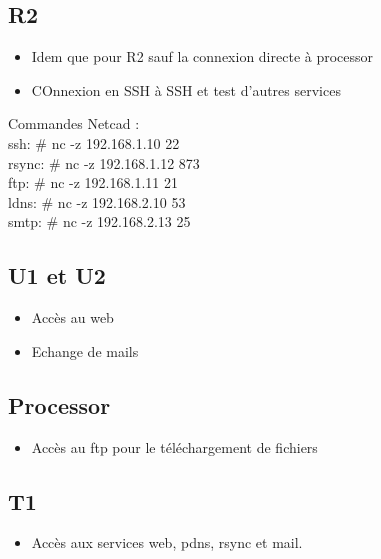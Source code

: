 \documentclass[a4paper,10pt,final,fleqn]{article}
\begin{document}
	\subsection{R2}

	\begin{itemize}
		\item Idem que pour R2 sauf la connexion directe à processor
		\item COnnexion en SSH à SSH et test d'autres services
	\end{itemize}


	Commandes Netcad : \\

	ssh:    # nc -z 192.168.1.10 22\\
	rsync: # nc -z 192.168.1.12 873\\
	ftp:    # nc -z 192.168.1.11 21\\
	ldns:  # nc -z 192.168.2.10 53\\
	smtp: # nc -z 192.168.2.13 25\\

	\subsection{U1 et U2}

		\begin{itemize}
			\item Accès au web
			\item Echange de mails
		\end{itemize}

	\subsection{Processor}

		\begin{itemize}
			\item Accès au ftp pour le téléchargement de fichiers
		\end{itemize}

	\subsection{T1}

		\begin{itemize}
			\item Accès aux services web, pdns, rsync et mail.
		\end{itemize}
\end{document}

